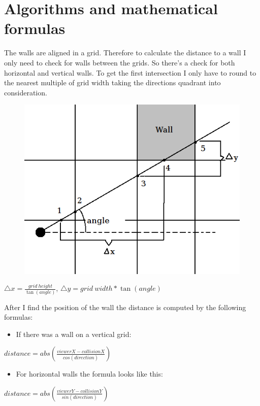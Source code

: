 \documentclass[a4paper,10pt]{article}
\begin{document}
\section{Algorithms and mathematical formulas}
The walls are aligned in a grid. Therefore to calculate the distance to a wall I
only need to check for walls between the grids. So there's a check for both
horizontal and vertical walls. To get the first intersection I only have to
round to the nearest multiple of grid width taking the directions quadrant into
consideration.
\begin{figure}[h!]
 \centering
 \includegraphics[scale=0.85]{find_wall.png}
\end{figure}
\begin{center}
$\triangle x=\frac{grid\: height}{\tan(angle)}$, $\triangle y=grid\:
width*\tan(angle)$
\par\end{center}

After I find the position of the wall the distance is computed by the following
formulas:


\begin{itemize}
\item If there was a wall on a vertical grid:
\end{itemize}
\begin{center}
$distance=abs(\frac{viewerX-collisionX}{cos(direction)})$\\

\par\end{center}
\begin{itemize}
\item For horizontal walls the formula looks like this:
\end{itemize}
\begin{center}
$distance=abs(\frac{viewerY-collisionY}{sin(direction)})$\\
\par\end{center}
\end{document}
